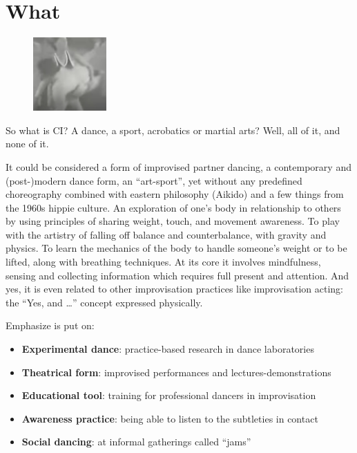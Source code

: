 \section{What}\label{sec:what}

\begin{figure}
\centering
\includegraphics[width=0.25\textwidth]{images/what}
\end{figure}

So what is CI? A dance, a sport, acrobatics or martial arts?
Well, all of it, and none of it.

It could be considered a form of improvised partner dancing, a contemporary and (post-)modern dance form, an ``art-sport'', yet without any predefined choreography combined with eastern philosophy (Aikido) and a few things from the 1960s hippie culture.
An exploration of one's body in relationship to others by using principles of sharing weight, touch, and movement awareness.
To play with the artistry of falling off balance and counterbalance, with gravity and physics.
To learn the mechanics of the body to handle someone's weight or to be lifted, along with breathing techniques.
At its core it involves mindfulness, sensing and collecting information which requires full present and attention.
And yes, it is even related to other improvisation practices like improvisation acting: the ``Yes, and \ldots'' concept expressed physically.

Emphasize is put on:
\begin{itemize}
	\item \textbf{Experimental dance}: practice-based research in dance laboratories
	\item \textbf{Theatrical form}: improvised performances and lectures-demonstrations
	\item \textbf{Educational tool}: training for professional dancers in improvisation
	\item \textbf{Awareness practice}: being able to listen to the subtleties in contact
	\item \textbf{Social dancing}: at informal gatherings called ``jams''
\end{itemize}

